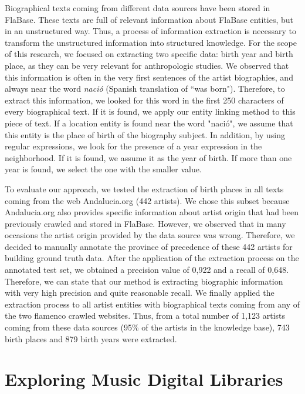 Biographical texts coming from different data sources have been stored in FlaBase. These texts are full of relevant information about FlaBase entities, but in an unstructured way. Thus, a process of information extraction is necessary to transform the unstructured information into structured knowledge. For the scope of this research, we focused on extracting two specific data: birth year and birth place, as they can be very relevant for anthropologic studies. We observed that this information is often in the very first sentences of the artist biographies, and always near the word \textit{naci\'{o}} (Spanish translation of ``was born"). Therefore, to extract this information, we looked for this word in the first 250 characters of every biographical text. If it is found, we apply our entity linking method to this piece of text. If a location entity is found near the word "naci\'{o}", we assume that this entity is the place of birth of the biography subject. In addition, by using regular expressions, we look for the presence of a year expression in the neighborhood. If it is found, we assume it as the year of birth. If more than one year is found, we select the one with the smaller value. 

To evaluate our approach, we tested the extraction of birth places in all texts coming from the web Andalucia.org (442 artists). We chose this subset because Andalucia.org also provides specific information about artist origin that had been previously crawled and stored in FlaBase. However, we observed that in many occasions the artist origin provided by the data source was wrong. Therefore, we decided to manually annotate the province of precedence of these 442 artists for building ground truth data. After the application of the extraction process on the annotated test set, we obtained a precision value of 0,922 and a recall of 0,648. Therefore, we can state that our method is extracting biographic information with very high precision and quite reasonable recall. 
We finally applied the extraction process to all artist entities with biographical texts coming from any of the two flamenco crawled websites. Thus, from a total number of 1,123 artists coming from these data sources (95\% of the artists in the knowledge base), 743 birth places and 879 birth years were extracted. 


\section{Exploring Music Digital Libraries}





